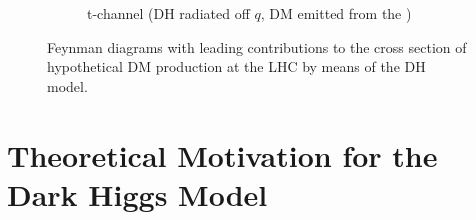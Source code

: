 \begin{figure}[hp]
\begin{subfigure}[t]{.42\textwidth}
%
%
%
%
	\caption{t-channel (DH radiated off \(q\), DM emitted from the \Zprime)}
	\label{fig:dh_tchannel}
	\end{subfigure}
	\caption{Feynman diagrams with leading contributions to the cross section of hypothetical DM production at the LHC by means of the DH model.}
	\label{fig:Feynman_DH}
\end{figure}


\section{Theoretical Motivation for the Dark Higgs Model}

